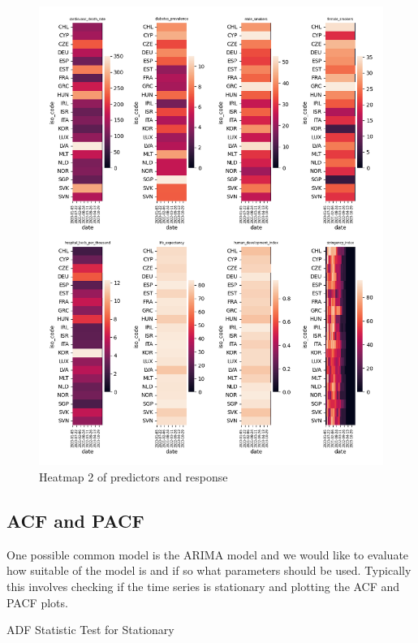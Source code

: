 \documentclass{article}
\begin{document}
\begin{figure}
\centering
\includegraphics[width=1\linewidth]{heatmap_plot2.png}
\caption{\label{fig:heat2}Heatmap 2 of predictors and response}
\end{figure}

\clearpage 

\subsection{ACF and PACF}

One possible common model is the ARIMA model and we would like to evaluate how suitable of the model is and if so what parameters should be used. Typically this involves checking if the time series is stationary and plotting the ACF and PACF plots.\\

\begin{table}
\caption{\label{tab:adf}ADF Statistic Test for Stationary}
\end{table}
\end{document}
